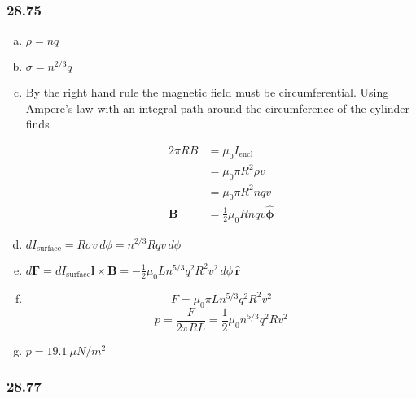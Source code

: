 \documentclass{article}
\begin{document}
\subsubsection{28.75}

\begin{enumerate}[(a)]
  \item $\rho = n q$

  \item $\sigma = n^{2/3} q$

  \item By the right hand rule the magnetic field must be circumferential. Using Ampere's law with an integral path around the circumference of the cylinder finds

        \begin{align*}
          2 \pi R B  & = \mu_0 I_\text{encl}                               \\
                     & = \mu_0 \pi R^2 \rho v                              \\
                     & = \mu_0 \pi R^2 n q v                               \\
          \mathbf{B} & = \frac{1}{2} \mu_0 R n q v \hat{\boldsymbol{\phi}}
        \end{align*}

  \item $dI_\text{surface} = R \sigma v \,d \phi = n^{2 / 3} R q v \,d \phi$

  \item $d \mathbf{F} = dI_\text{surface} \mathbf{l} \times \mathbf{B} = -\frac{1}{2} \mu_0 L n^{5 / 3} q^2 R^2 v^2 \,d \phi \,\hat{\mathbf{r}}$

  \item \[F = \mu_0 \pi L n^{5 / 3} q^2 R^2 v^2\] \[p = \frac{F}{2 \pi R L} = \frac{1}{2} \mu_0 n^{5 / 3} q^2 R v^2\]

  \item $p = \qty{19.1}{\mu N/m^2}$
\end{enumerate}

\subsubsection{28.77}
\end{document}
